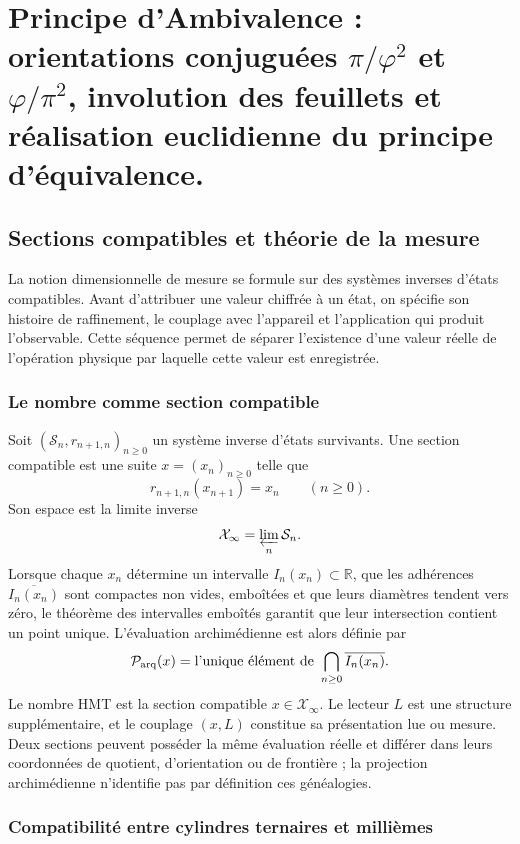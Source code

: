 \chapter{Principe d'Ambivalence : orientations conjuguées \texorpdfstring{\(\pi/\varphi^2\)}{π/φ²} et \texorpdfstring{\(\varphi/\pi^2\)}{φ/π²}, involution des feuillets et réalisation euclidienne du principe d'équivalence.}
\label{chap:83-16}

\section{Sections compatibles et théorie de la mesure}
\label{p12-83-c16-s1:chap:medida}

La notion dimensionnelle de mesure se formule sur des systèmes inverses d'états
compatibles. Avant d'attribuer une valeur chiffrée à un état, on spécifie son histoire
de raffinement, le couplage avec l'appareil et l'application qui produit
l'observable. Cette séquence permet de séparer l'existence d'une valeur réelle de
l'opération physique par laquelle cette valeur est enregistrée.

\subsection{Le nombre comme section compatible}

Soit \((\mathcal S_n,r_{n+1,n})_{n\geq0}\) un système inverse d'états
survivants. Une section compatible est une suite
\(x=(x_n)_{n\geq0}\) telle que
\[
 r_{n+1,n}(x_{n+1})=x_n
 \qquad(n\geq0).
\]
Son espace est la limite inverse
\[
 \mathcal X_\infty=\varprojlim_n\mathcal S_n.
\]
Lorsque chaque \(x_n\) détermine un intervalle \(I_n(x_n)\subset\mathbb R\), que les
adhérences \(\overline{I_n(x_n)}\) sont compactes non vides, emboîtées et que
leurs diamètres tendent vers zéro, le théorème des intervalles emboîtés garantit
que leur intersection contient un point unique. L'évaluation archimédienne est
alors définie par
\[
 \mathcal P_{\rm arq}(x)
 =\text{l'unique élément de }
   \bigcap_{n\geq0}\overline{I_n(x_n)}.
\]
Le nombre HMT est la section compatible
\(x\in\mathcal X_\infty\). Le lecteur \(L\) est une structure supplémentaire, et le
couplage \((x,L)\) constitue sa présentation lue ou mesure. Deux
sections peuvent posséder la même évaluation réelle et différer dans leurs coordonnées
de quotient, d'orientation ou de frontière ; la projection archimédienne n'identifie pas
par définition ces généalogies.

\subsection{Compatibilité entre cylindres ternaires et millièmes}

